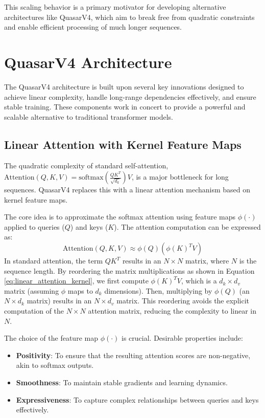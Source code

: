\documentclass{article}
\begin{document}
This scaling behavior is a primary motivator for developing alternative architectures like QuasarV4, which aim to break free from quadratic constraints and enable efficient processing of much longer sequences.



\section{QuasarV4 Architecture}
The QuasarV4 architecture is built upon several key innovations designed to achieve linear complexity, handle long-range dependencies effectively, and ensure stable training. These components work in concert to provide a powerful and scalable alternative to traditional transformer models.

\subsection{Linear Attention with Kernel Feature Maps}
\label{sec:linear_attention}
The quadratic complexity of standard self-attention, $\text{Attention}(Q, K, V) = \text{softmax}(\frac{QK^T}{\sqrt{d_k}})V$, is a major bottleneck for long sequences. QuasarV4 replaces this with a linear attention mechanism based on kernel feature maps.

The core idea is to approximate the softmax attention using feature maps $\phi(\cdot)$ applied to queries ($Q$) and keys ($K$). The attention computation can be expressed as:
\begin{equation}
\text{Attention}(Q, K, V) \approx \phi(Q) (\phi(K)^T V)
\label{eq:linear_attention_kernel}
\end{equation}
In standard attention, the term $QK^T$ results in an $N \times N$ matrix, where $N$ is the sequence length. By reordering the matrix multiplications as shown in Equation \ref{eq:linear_attention_kernel}, we first compute $\phi(K)^T V$, which is a $d_k \times d_v$ matrix (assuming $\phi$ maps to $d_k$ dimensions). Then, multiplying by $\phi(Q)$ (an $N \times d_k$ matrix) results in an $N \times d_v$ matrix. This reordering avoids the explicit computation of the $N \times N$ attention matrix, reducing the complexity to linear in $N$.

The choice of the feature map $\phi(\cdot)$ is crucial. Desirable properties include:

\begin{itemize}
    \item \textbf{Positivity}: To ensure that the resulting attention scores are non-negative, akin to softmax outputs.
    \item \textbf{Smoothness}: To maintain stable gradients and learning dynamics.
    \item \textbf{Expressiveness}: To capture complex relationships between queries and keys effectively.
\end{itemize}
\end{document}
